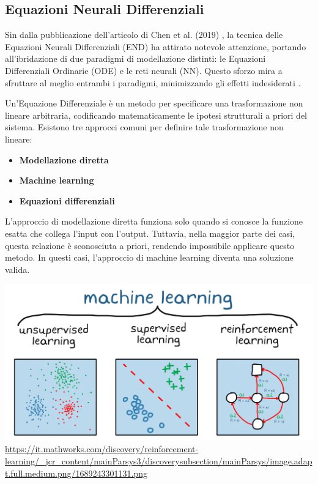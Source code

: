 \subsection{Equazioni Neurali Differenziali}

Sin dalla pubblicazione dell'articolo di Chen et al. (2019) 
\cite{chen2019neural}, la tecnica delle Equazioni Neurali Differenziali 
(END) ha attirato notevole attenzione, portando all'ibridazione di due 
paradigmi di modellazione distinti: le Equazioni Differenziali Ordinarie 
(ODE) e le reti neurali (NN). Questo sforzo mira a sfruttare al meglio 
entrambi i paradigmi, minimizzando gli effetti indesiderati \cite{chen2019neural} \cite{Kim_2021}.

Un'Equazione Differenziale è un metodo per specificare una trasformazione 
non lineare arbitraria, codificando matematicamente le ipotesi strutturali 
a priori del sistema. Esistono tre approcci comuni per definire tale 
trasformazione non lineare:

\begin{itemize}
    \item \textbf{Modellazione diretta}
    \item \textbf{Machine learning}
    \item \textbf{Equazioni differenziali}
\end{itemize}

L'approccio di modellazione diretta funziona solo quando si conosce 
la funzione esatta che collega l'input con l'output. Tuttavia, nella 
maggior parte dei casi, questa relazione è sconosciuta a priori, 
rendendo impossibile applicare questo metodo. In questi casi, l'approccio 
di machine learning diventa una soluzione valida.

\begin{minipage}{\linewidth}
    \centering
    \includegraphics[width=\textwidth]{img/1689243301131.png}
    \url{https://it.mathworks.com/discovery/reinforcement-learning/_jcr_content/mainParsys3/discoverysubsection/mainParsys/image.adapt.full.medium.png/1689243301131.png}
    \label{fig:ML_example}
\end{minipage}

